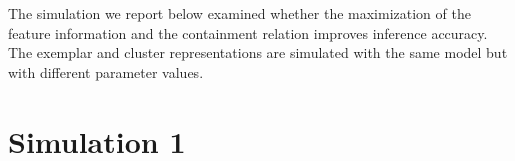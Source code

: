 \documentclass[doc]{apa6}
\DeclareMathOperator*{\argmin}{arg\,min}
\begin{document}
The simulation we report below examined whether the maximization of the feature information and the
containment relation improves inference accuracy. The exemplar and cluster representations are
simulated with the same model but with different parameter values.


\section*{Simulation 1}

%
%
%
\end{document}
